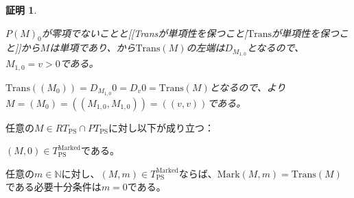 \documentclass[dvipdfmx,uplatex]{jsarticle}
\theoremstyle{customnonumberbreakfortheorem}
\theoremstyle{customnonumberbreakforproof}
\newtheorem{hideableproof}{証明}
\begin{document}
\begin{hideableproof}
\begin{indented}
\begin{indented}
\begin{indented}
				\item \(P(M)_0\)が零項でないことと[[Transが単項性を保つこと|\(\textrm{Trans}\)が単項性を保つこと]]から\(M\)は単項であり、から\(\textrm{Trans}(M)\)の左端は\(D_{M_{1,0}}\)となるので、\(M_{1,0} = v > 0\)である。
				\item \(\textrm{Trans}((M_0)) = D_{M_{1,0}} 0 = D_v 0 = \textrm{Trans}(M)\)となるので、より\(M = (M_0) = ((M_{1,0},M_{1,0})) = ((v,v))\)である。
			\end{indented}
		\end{indented}
	\end{indented}
\end{hideableproof}

\begin{corollary}\label{左端第1基点のMarkの基本性質}
	任意の\(M \in RT_{\textrm{PS}} \cap PT_{\textrm{PS}}\)に対し以下が成り立つ：
	\begin{penumerate}
		\item \((M,0) \in T_{\textrm{PS}}^{\textrm{Marked}}\)である。
		\item 任意の\(m \in \mathbb{N}\)に対し、\((M,m) \in T_{\textrm{PS}}^{\textrm{Marked}}\)ならば、\(\textrm{Mark}(M,m) = \textrm{Trans}(M)\)である必要十分条件は\(m = 0\)である。
	\end{penumerate}
\end{corollary}
\end{document}
